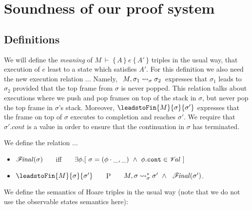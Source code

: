 


\section{Soundness of our proof system}

\subsection{Definitions}

We will define the {\emph {meaning}} of  $M\ \vdash\  \{\, A \,  \}\ e\  \{\, A' \, \}$ triples in the usual way, \ie that execution of $e$ least to a state which satisfies $A'$. For this definition we also need the new execution relation ...
Namely, \ $M, \sigma_1 \leadsto_{\sigma} \sigma_2$\  expresses that $\sigma_1$ leads to $\sigma_2$ provided
 that the top frame from $\sigma$ is never popped. This relation talks about executions where we push and pop frames on top of the stack in $\sigma$, but never pop the top frame in $\sigma$'s stack. Moreover, $\leadstoFin {M} {\sigma} {\sigma'}$  expresses that the frame on top of $\sigma$ executes to completion and reaches $\sigma'$.
We require that $\sigma'.cont$ is a value in order to ensure that the continuation in $\sigma$ has terminated. 
 
{
\begin{definition}
\label{def:term}
We define the relation  ...
\begin{itemize}
\item
${\mathcal F}\!\mathit{inal}(\sigma)$ \ \ \ iff \ \ \  $\exists \phi. [\ \sigma = (\phi\cdot\_,\_) \ \wedge \ \phi.\texttt{cont} \in {\mathcal V}\!\mathit{al} \ ]$
\item
$\leadstoFin {M} {\sigma} {\sigma'}$ \ \ \ P \ \ \  $\leadstoRecStar {M} {\sigma} {\sigma} {\sigma'} \ \wedge \ \ \Final{\sigma'}$.
\end{itemize}
\end{definition}
}

We define the semantics of Hoare triples in the usual way (note that we do not use the observable states semantics here): 

